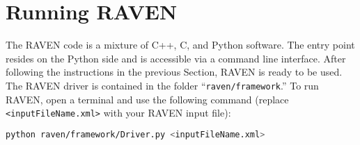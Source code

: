 \section{Running RAVEN}

The RAVEN code is a mixture of C++, C, and Python software. The entry point 
resides on the Python side and is accessible via a command line interface.
%
After following the instructions in the previous Section, RAVEN is ready to be
used. 
%
The RAVEN driver is contained in the folder ``\texttt{raven/framework}.''
%
To run RAVEN, open a terminal and use the following command (replace \texttt{<inputFileName.xml>} with your RAVEN input file):

\begin{lstlisting}[language=bash]
python raven/framework/Driver.py <inputFileName.xml>
\end{lstlisting}
